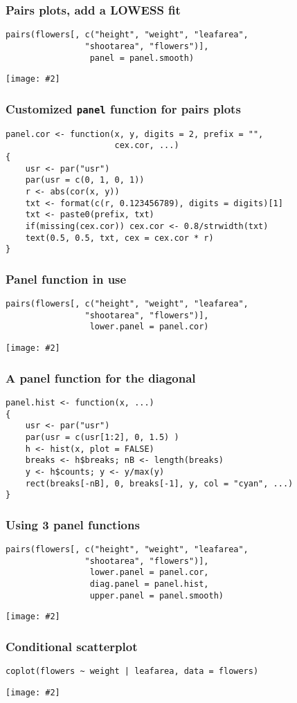 \documentclass{beamer}
\newcommand{\fig}[2]{\centerline{\texttt{[image: \#2]}}}
\newcommand{\bfr}[1]{\begin{frame}[fragile]\frametitle{{ #1 }}}
\begin{document}
\bfr{Pairs plots, add a LOWESS fit}
{\scriptsize
\begin{verbatim}
pairs(flowers[, c("height", "weight", "leafarea", 
                "shootarea", "flowers")], 
                 panel = panel.smooth)
\end{verbatim}
}
\fig{.8}{plot21-1.png}
\end{frame}


\bfr{Customized {\tt panel} function for pairs plots}
{\scriptsize
\begin{verbatim}
panel.cor <- function(x, y, digits = 2, prefix = "", 
                      cex.cor, ...)
{
    usr <- par("usr")
    par(usr = c(0, 1, 0, 1))
    r <- abs(cor(x, y))
    txt <- format(c(r, 0.123456789), digits = digits)[1]
    txt <- paste0(prefix, txt)
    if(missing(cex.cor)) cex.cor <- 0.8/strwidth(txt)
    text(0.5, 0.5, txt, cex = cex.cor * r)
}
\end{verbatim}
}
\end{frame}

\bfr{Panel function in use}
{\scriptsize
\begin{verbatim}
pairs(flowers[, c("height", "weight", "leafarea", 
                "shootarea", "flowers")], 
                 lower.panel = panel.cor)
\end{verbatim}
}
\fig{.8}{plot23-1.png}
\end{frame}

\bfr{A panel function for the diagonal}
{\scriptsize
\begin{verbatim}
panel.hist <- function(x, ...)
{
    usr <- par("usr")
    par(usr = c(usr[1:2], 0, 1.5) )
    h <- hist(x, plot = FALSE)
    breaks <- h$breaks; nB <- length(breaks)
    y <- h$counts; y <- y/max(y)
    rect(breaks[-nB], 0, breaks[-1], y, col = "cyan", ...)
}
\end{verbatim}
}
\end{frame}

\bfr{Using 3 panel functions}
{\scriptsize
\begin{verbatim}
pairs(flowers[, c("height", "weight", "leafarea", 
                "shootarea", "flowers")], 
                 lower.panel = panel.cor,
                 diag.panel = panel.hist,
                 upper.panel = panel.smooth)
\end{verbatim}
}
\fig{.8}{plot25-1.png}
\end{frame}

\bfr{Conditional scatterplot}
{\scriptsize
\begin{verbatim}
coplot(flowers ~ weight | leafarea, data = flowers)
\end{verbatim}
}
\fig{1}{plot26-1.png}
\end{frame}
\end{document}
